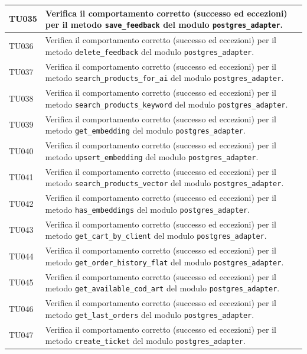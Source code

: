 \documentclass[a4paper,11pt,oneside]{scrartcl}
\begin{document}
\begin{longtable}{|p{1.9cm}|p{11.6cm}|c|}
TU035 & Verifica il comportamento corretto (successo ed eccezioni) per il metodo \texttt{save\_feedback} del modulo \texttt{postgres\_adapter}. & \\ \hline
TU036 & Verifica il comportamento corretto (successo ed eccezioni) per il metodo \texttt{delete\_feedback} del modulo \texttt{postgres\_adapter}. & \\ \hline
TU037 & Verifica il comportamento corretto (successo ed eccezioni) per il metodo \texttt{search\_products\_for\_ai} del modulo \texttt{postgres\_adapter}. & \\ \hline
TU038 & Verifica il comportamento corretto (successo ed eccezioni) per il metodo \texttt{search\_products\_keyword} del modulo \texttt{postgres\_adapter}. & \\ \hline
TU039 & Verifica il comportamento corretto (successo ed eccezioni) per il metodo \texttt{get\_embedding} del modulo \texttt{postgres\_adapter}. & \\ \hline
TU040 & Verifica il comportamento corretto (successo ed eccezioni) per il metodo \texttt{upsert\_embedding} del modulo \texttt{postgres\_adapter}. & \\ \hline
TU041 & Verifica il comportamento corretto (successo ed eccezioni) per il metodo \texttt{search\_products\_vector} del modulo \texttt{postgres\_adapter}. & \\ \hline
TU042 & Verifica il comportamento corretto (successo ed eccezioni) per il metodo \texttt{has\_embeddings} del modulo \texttt{postgres\_adapter}. & \\ \hline
TU043 & Verifica il comportamento corretto (successo ed eccezioni) per il metodo \texttt{get\_cart\_by\_client} del modulo \texttt{postgres\_adapter}. & \\ \hline
TU044 & Verifica il comportamento corretto (successo ed eccezioni) per il metodo \texttt{get\_order\_history\_flat} del modulo \texttt{postgres\_adapter}. & \\ \hline
TU045 & Verifica il comportamento corretto (successo ed eccezioni) per il metodo \texttt{get\_available\_cod\_art} del modulo \texttt{postgres\_adapter}. & \\ \hline
TU046 & Verifica il comportamento corretto (successo ed eccezioni) per il metodo \texttt{get\_last\_orders} del modulo \texttt{postgres\_adapter}. & \\ \hline
TU047 & Verifica il comportamento corretto (successo ed eccezioni) per il metodo \texttt{create\_ticket} del modulo \texttt{postgres\_adapter}. & \\ \hline

\end{longtable}
\end{document}
